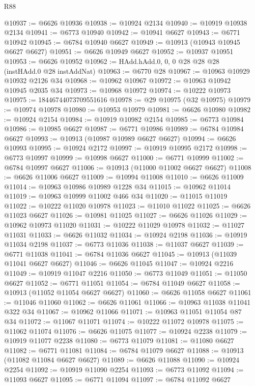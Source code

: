 \begin{lexlean}{R88}
\begin{coremodule}
@10937 := @6626 @10936
@10938 := @10924 @2134
@10940 := @10919 @10938 @2134
@10941 := @6773 @10940
@10942 := @10941 @6627
@10943 := @6771 @10942
@10945 := @6784 @10940 @6627
@10949 := @10913 (@10943 @10945 @6627 @6627)
@10951 := @6626 @10949 @6627
@10952 := @10937 @10951
@10953 := @6626 @10952
@10962 := HAdd.hAdd.{0, 0, 0} @28 @28 @28 (instHAdd.{0} @28 instAddNat)
@10963 := @6770 @28
@10967 := @10963 @10929 @10932 @2126 @34
@10968 := @10962 @10967
@10972 := @10963 @10942 @10945 @2035 @34
@10973 := @10968 @10972
@10974 := @10222 @10973
@10975 := 18446744073709551616
@10978 := @29 @10975 (@32 @10975)
@10979 := @10974 @10978
@10980 := @10953 @10979
@10981 := @6626 @10980
@10982 := @10924 @2154
@10984 := @10919 @10982 @2154
@10985 := @6773 @10984
@10986 := @10985 @6627
@10987 := @6771 @10986
@10989 := @6784 @10984 @6627
@10993 := @10913 (@10987 @10989 @6627 @6627)
@10994 := @6626 @10993
@10995 := @10924 @2172
@10997 := @10919 @10995 @2172
@10998 := @6773 @10997
@10999 := @10998 @6627
@11000 := @6771 @10999
@11002 := @6784 @10997 @6627
@11006 := @10913 (@11000 @11002 @6627 @6627)
@11008 := @6626 @11006 @6627
@11009 := @10994 @11008
@11010 := @6626 @11009
@11014 := @10963 @10986 @10989 @1228 @34
@11015 := @10962 @11014
@11019 := @10963 @10999 @11002 @466 @34
@11020 := @11015 @11019
@11022 := @10222 @11020 @10978
@11023 := @11010 @11022
@11025 := @6626 @11023 @6627
@11026 := @10981 @11025
@11027 := @6626 @11026
@11029 := @10962 @10973 @11020
@11031 := @10222 @11029 @10978
@11032 := @11027 @11031
@11033 := @6626 @11032
@11034 := @10924 @2198
@11036 := @10919 @11034 @2198
@11037 := @6773 @11036
@11038 := @11037 @6627
@11039 := @6771 @11038
@11041 := @6784 @11036 @6627
@11045 := @10913 (@11039 @11041 @6627 @6627)
@11046 := @6626 @11045
@11047 := @10924 @2216
@11049 := @10919 @11047 @2216
@11050 := @6773 @11049
@11051 := @11050 @6627
@11052 := @6771 @11051
@11054 := @6784 @11049 @6627
@11058 := @10913 (@11052 @11054 @6627 @6627)
@11060 := @6626 @11058 @6627
@11061 := @11046 @11060
@11062 := @6626 @11061
@11066 := @10963 @11038 @11041 @322 @34
@11067 := @10962 @11066
@11071 := @10963 @11051 @11054 @87 @34
@11072 := @11067 @11071
@11074 := @10222 @11072 @10978
@11075 := @11062 @11074
@11076 := @6626 @11075
@11077 := @10924 @2238
@11079 := @10919 @11077 @2238
@11080 := @6773 @11079
@11081 := @11080 @6627
@11082 := @6771 @11081
@11084 := @6784 @11079 @6627
@11088 := @10913 (@11082 @11084 @6627 @6627)
@11089 := @6626 @11088
@11090 := @10924 @2254
@11092 := @10919 @11090 @2254
@11093 := @6773 @11092
@11094 := @11093 @6627
@11095 := @6771 @11094
@11097 := @6784 @11092 @6627

\end{coremodule}
\end{lexlean}

